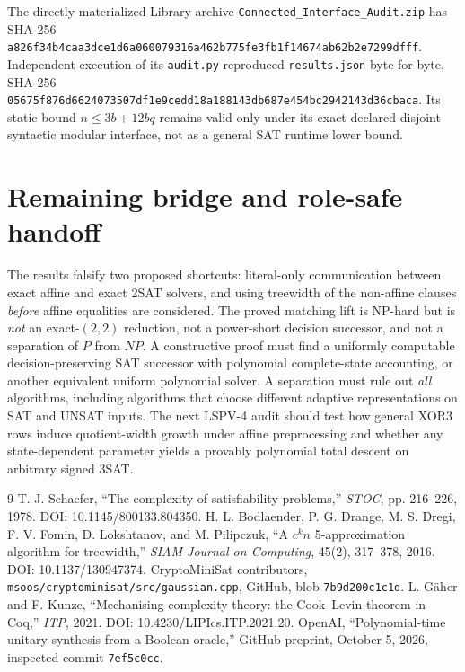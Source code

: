 \documentclass[11pt]{article}
\begin{document}
The directly materialized Library archive \texttt{Connected\_Interface\_Audit.zip} has SHA-256 \texttt{a826f34b4caa3dce1d6a060079316a462b775fe3fb1f14674ab62b2e7299dfff}. Independent execution of its \texttt{audit.py} reproduced \texttt{results.json} byte-for-byte, SHA-256 \texttt{05675f876d6624073507df1e9cedd18a188143db687e454bc2942143d36cbaca}. Its static bound $n\le 3b+12bq$ remains valid only under its exact declared disjoint syntactic modular interface, not as a general SAT runtime lower bound.

\section{Remaining bridge and role-safe handoff}
The results falsify two proposed shortcuts: literal-only communication between exact affine and exact 2SAT solvers, and using treewidth of the non-affine clauses \emph{before} affine equalities are considered. The proved matching lift is NP-hard but is \emph{not} an exact-$(2,2)$ reduction, not a power-short decision successor, and not a separation of $P$ from $NP$. A constructive proof must find a uniformly computable decision-preserving SAT successor with polynomial complete-state accounting, or another equivalent uniform polynomial solver. A separation must rule out \emph{all} algorithms, including algorithms that choose different adaptive representations on SAT and UNSAT inputs. The next LSPV-4 audit should test how general XOR3 rows induce quotient-width growth under affine preprocessing and whether any state-dependent parameter yields a provably polynomial total descent on arbitrary signed 3SAT.

\begin{thebibliography}{9}
 T. J. Schaefer, ``The complexity of satisfiability problems,'' \emph{STOC}, pp. 216--226, 1978. DOI: 10.1145/800133.804350.
 H. L. Bodlaender, P. G. Drange, M. S. Dregi, F. V. Fomin, D. Lokshtanov, and M. Pilipczuk, ``A $c^kn$ 5-approximation algorithm for treewidth,'' \emph{SIAM Journal on Computing}, 45(2), 317--378, 2016. DOI: 10.1137/130947374.
 CryptoMiniSat contributors, \texttt{msoos/cryptominisat/src/gaussian.cpp}, GitHub, blob \texttt{7b9d200c1c1d}.
 L. G\"aher and F. Kunze, ``Mechanising complexity theory: the Cook--Levin theorem in Coq,'' \emph{ITP}, 2021. DOI: 10.4230/LIPIcs.ITP.2021.20.
 OpenAI, ``Polynomial-time unitary synthesis from a Boolean oracle,'' GitHub preprint, October 5, 2026, inspected commit \texttt{7ef5c0cc}.
\end{thebibliography}
\end{document}
